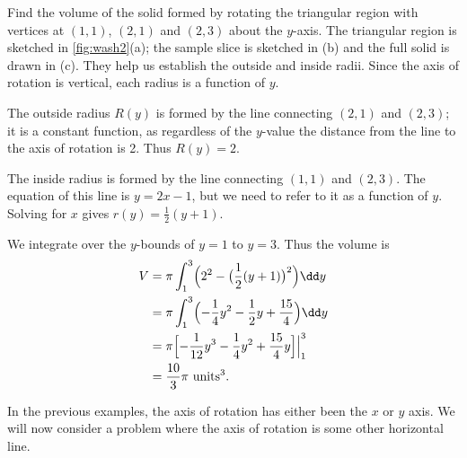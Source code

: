 \begin{example}\label{ex_wash2}
Find the volume of the solid formed by rotating the triangular region with vertices at $(1,1)$, $(2,1)$ and $(2,3)$ about the $y$-axis.
\solution
The triangular region is sketched in \autoref{fig:wash2}(a); the sample slice is sketched in (b) and the full solid is drawn in (c). They help us establish the outside and inside radii. Since the axis of rotation is vertical, each radius is a function of $y$. 

The outside radius $R(y)$ is formed by the line connecting $(2,1)$ and $(2,3)$; it is a constant function, as regardless of the $y$-value the distance from the line to the axis of rotation is 2. Thus $R(y)=2$.

The inside radius is formed by the line connecting $(1,1)$ and $(2,3)$. The equation of this line is $y=2x-1$, but we need to refer to it as a function of $y$. Solving for $x$ gives $r(y) = \frac12(y+1)$. 

We integrate over the $y$-bounds of $y=1$ to $y=3$. Thus the volume is
\begin{align*}
V 	&=	\pi\int_1^3\Bigl(2^2 - \bigl(\frac12(y+1)\bigr)^2\Bigr)\dd y \\
		&=	\pi\int_1^3\Bigl(-\frac14y^2-\frac12y+\frac{15}4\Bigr)\dd y \\
		&= 	\pi\Bigl[-\frac1{12}y^3-\frac14y^2+\frac{15}4y\Bigr]\Big|_1^3\\
		&= \frac{10}3\pi %
		\ \text{units}^3.
\end{align*}
\end{example}

In the previous examples, the axis of rotation has either been the $x$ or $y$ axis. We will now consider a problem where the axis of rotation is some other horizontal line.

